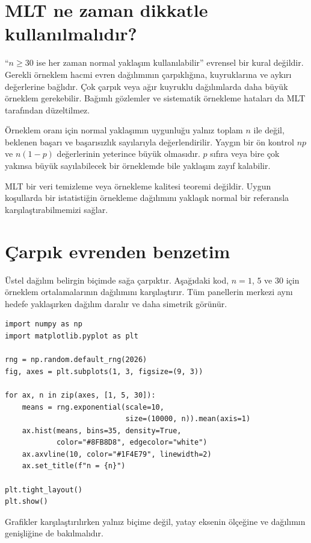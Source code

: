 \section{MLT ne zaman dikkatle kullanılmalıdır?}
\label{sec:clt-cautions}

``$n\geq30$ ise her zaman normal yaklaşım kullanılabilir'' evrensel bir kural
değildir. Gerekli örneklem hacmi evren dağılımının çarpıklığına, kuyruklarına
ve aykırı değerlerine bağlıdır. Çok çarpık veya ağır kuyruklu dağılımlarda
daha büyük örneklem gerekebilir. Bağımlı gözlemler ve sistematik örnekleme
hataları da MLT tarafından düzeltilmez.

Örneklem oranı için normal yaklaşımın uygunluğu yalnız toplam $n$ ile değil,
beklenen başarı ve başarısızlık sayılarıyla değerlendirilir. Yaygın bir ön
kontrol $np$ ve $n(1-p)$ değerlerinin yeterince büyük olmasıdır. $p$ sıfıra
veya bire çok yakınsa büyük sayılabilecek bir örneklemde bile yaklaşım zayıf
kalabilir.

\begin{sezgibox}
MLT bir veri temizleme veya örnekleme kalitesi teoremi değildir. Uygun
koşullarda bir istatistiğin örnekleme dağılımını yaklaşık normal bir referansla
karşılaştırabilmemizi sağlar.
\end{sezgibox}

\section{Çarpık evrenden benzetim}

Üstel dağılım belirgin biçimde sağa çarpıktır. Aşağıdaki kod, $n=1$, $5$ ve
$30$ için örneklem ortalamalarının dağılımını karşılaştırır. Tüm panellerin
merkezi aynı hedefe yaklaşırken dağılım daralır ve daha simetrik görünür.

\begin{softwarebox}
\begin{lstlisting}
import numpy as np
import matplotlib.pyplot as plt

rng = np.random.default_rng(2026)
fig, axes = plt.subplots(1, 3, figsize=(9, 3))

for ax, n in zip(axes, [1, 5, 30]):
    means = rng.exponential(scale=10,
                            size=(10000, n)).mean(axis=1)
    ax.hist(means, bins=35, density=True,
            color="#8FB8D8", edgecolor="white")
    ax.axvline(10, color="#1F4E79", linewidth=2)
    ax.set_title(f"n = {n}")

plt.tight_layout()
plt.show()
\end{lstlisting}
Grafikler karşılaştırılırken yalnız biçime değil, yatay eksenin ölçeğine ve
dağılımın genişliğine de bakılmalıdır.
\end{softwarebox}

